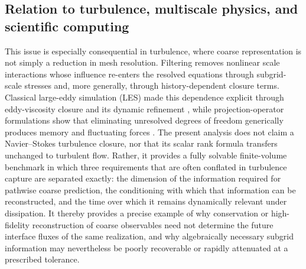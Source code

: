 \documentclass[preprint,12pt]{elsarticle}
\theoremstyle{plain}
\theoremstyle{remark}
\theoremstyle{definition}
\begin{document}

\color{black}
\subsection{Relation to turbulence, multiscale physics, and scientific computing}

This issue is especially consequential in turbulence, where coarse representation is not
simply a reduction in mesh resolution. Filtering removes nonlinear scale interactions whose
influence re-enters the resolved equations through subgrid-scale stresses and, more generally,
through history-dependent closure terms. Classical large-eddy simulation (LES) made this
dependence explicit through eddy-viscosity closure and its dynamic refinement
\cite{smagorinsky1963,germano1991}, while projection-operator formulations show that
eliminating unresolved degrees of freedom generically produces memory and fluctuating
forces \cite{zwanzig1961,mori1965}. The present analysis does not claim a
Navier--Stokes turbulence closure, nor that its scalar rank formula transfers unchanged to
turbulent flow. Rather, it provides a fully solvable finite-volume benchmark in which three
requirements that are often conflated in turbulence capture are separated exactly: the
dimension of the information required for pathwise coarse prediction, the conditioning with
which that information can be reconstructed, and the time over which it remains dynamically
relevant under dissipation. It thereby provides a precise example of why conservation or
high-fidelity reconstruction of coarse observables need not determine the future interface
fluxes of the same realization, and why algebraically necessary subgrid information may
nevertheless be poorly recoverable or rapidly attenuated at a prescribed tolerance.
\end{document}
